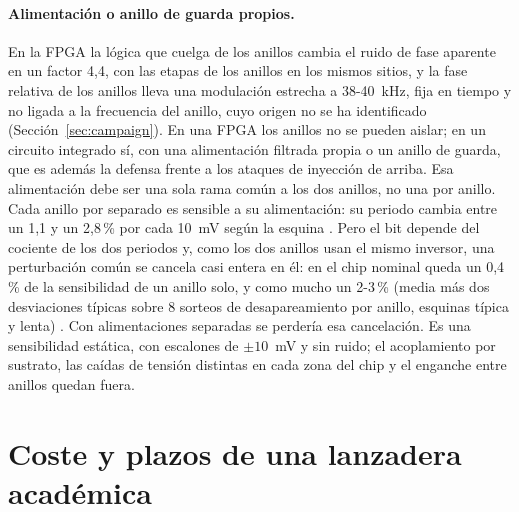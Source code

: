 \paragraph{Alimentación o anillo de guarda propios.} En la \ac{FPGA} la
lógica que cuelga de los anillos cambia el ruido de fase aparente en un
factor 4,4, con las etapas de los anillos en los mismos sitios, y la
fase relativa de los anillos lleva una modulación estrecha a 38-40~kHz,
fija en tiempo y no ligada a la frecuencia del anillo, cuyo origen no se
ha identificado \meas{} (Sección~\ref{sec:campaign}). En una \ac{FPGA} los anillos no se
pueden aislar; en un circuito integrado sí, con una alimentación
filtrada propia o un anillo de guarda, que es además la defensa frente a
los ataques de inyección de arriba. Esa alimentación debe ser una sola
rama común a los dos anillos, no una por anillo. Cada anillo por separado
es sensible a su alimentación: su periodo cambia entre un 1,1 y un
2,8\,\% por cada 10~mV según la esquina \simu{}. Pero el bit depende del
cociente de los dos periodos y, como los dos anillos usan el mismo
inversor, una perturbación común se cancela casi entera en él: en el
chip nominal queda un 0,4\,\% de la sensibilidad de un anillo solo, y
como mucho un 2-3\,\% (media más dos desviaciones típicas sobre 8 sorteos
de desapareamiento por anillo, esquinas típica y lenta) \simu{}. Con
alimentaciones separadas se perdería esa cancelación. Es una sensibilidad
estática, con escalones de $\pm10$~mV y sin ruido; el acoplamiento por
sustrato, las caídas de tensión distintas en cada zona del chip y el
enganche entre anillos quedan fuera.

\section{Coste y plazos de una lanzadera académica}
\label{sec:shuttle}

